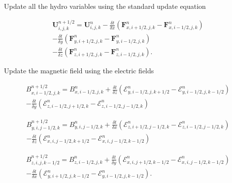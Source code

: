 Update all the hydro variables using the standard update equation

\begin{equation}
    \begin{aligned}
        \boldsymbol{U}^{n+1/2}_{i,j,k} = \boldsymbol{U}^{n}_{i,j,k}
        - \frac{\delta t}{\delta x} \left( \boldsymbol{F}^n_{x,i+1/2,j,k} - \boldsymbol{F}^n_{x,i-1/2,j,k} \right) \\
        - \frac{\delta t}{\delta y} \left( \boldsymbol{F}^n_{y,i+1/2,j,k} - \boldsymbol{F}^n_{y,i-1/2,j,k} \right) \\
        - \frac{\delta t}{\delta z} \left( \boldsymbol{F}^n_{z,i+1/2,j,k} - \boldsymbol{F}^n_{z,i-1/2,j,k} \right).
    \end{aligned}
\end{equation}

Update the magnetic field using the electric fields

\begin{equation}
    \begin{aligned}
        B^{n+1/2}_{x,i-1/2,j,k} = B^{n}_{x,i-1/2,j,k}
        + \frac{\delta t}{\delta z} \left( \mathcal{E}^n_{y,i-1/2,j,k+1/2} - \mathcal{E}^n_{y,i-1/2,j,k-1/2} \right) \\
        - \frac{\delta t}{\delta y} \left( \mathcal{E}^n_{z,i-1/2,j+1/2,k} - \mathcal{E}^n_{z,i-1/2,j-1/2,k} \right)
    \end{aligned}
\end{equation}

\begin{equation}
    \begin{aligned}
        B^{n+1/2}_{y,i,j-1/2,k} = B^{n}_{y,i,j-1/2,k}
        + \frac{\delta t}{\delta x} \left( \mathcal{E}^n_{z,i+1/2,j-1/2,k} - \mathcal{E}^n_{z,i-1/2,j-1/2,k} \right) \\
        - \frac{\delta t}{\delta z} \left( \mathcal{E}^n_{x,i,j-1/2,k+1/2} - \mathcal{E}^n_{x,i,j-1/2,k-1/2} \right)
    \end{aligned}
\end{equation}

\begin{equation}
    \begin{aligned}
        B^{n+1/2}_{z,i,j,k-1/2} = B^{n}_{z,i-1/2,j,k}
        + \frac{\delta t}{\delta y} \left( \mathcal{E}^n_{x,i,j+1/2,k-1/2} - \mathcal{E}^n_{x,i,j-1/2,k-1/2} \right) \\
        - \frac{\delta t}{\delta x} \left( \mathcal{E}^n_{y,i+1/2,j,k-1/2} - \mathcal{E}^n_{y,i-1/2,j,k-1/2} \right).
    \end{aligned}
\end{equation}

